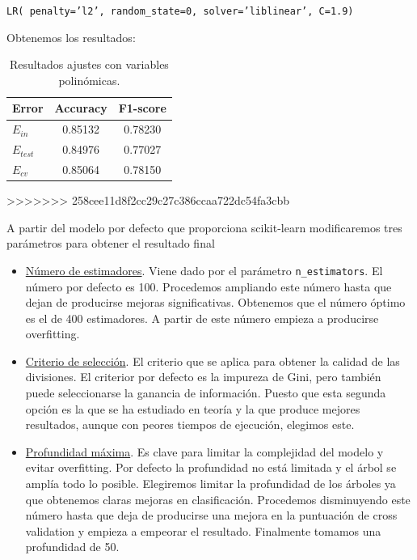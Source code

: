 \documentclass[11pt,a4paper]{article}
\begin{document}
{\begin{center}
    \texttt{LR( penalty='l2', random\_state=0, solver='liblinear', C=1.9)}
  \end{center}}

Obtenemos los resultados:

\begin{table}[h]
\begin{center}
\begin{tabular}{|l|c|c|}
\hline
  Error & Accuracy & F1-score \\ \hline
  $E_{in}$ & 0.85132 & 0.78230 \\
  $E_{test}$ & 0.84976 & 0.77027  \\
  $E_{cv}$ &0.85064 & 0.78150  \\\hline
\end{tabular}
\caption{Resultados ajustes con variables polinómicas.}

\end{center}
\end{table}
>>>>>>> 258cee11d8f2cc29c27c386ccaa722dc54fa3cbb

A partir del modelo por defecto que proporciona scikit-learn modificaremos tres parámetros para obtener el resultado final

\begin{itemize}
\item \underline{Número de estimadores}. Viene dado por el parámetro \texttt{n\_estimators}. El número por defecto es 100. Procedemos ampliando este número hasta que dejan de producirse mejoras significativas. Obtenemos que el número óptimo es el de 400 estimadores. A partir de este número empieza a producirse overfitting.
\item \underline{Criterio de selección}. El criterio que se aplica para obtener la calidad de las divisiones. El criterior por defecto es la impureza de Gini, pero también puede seleccionarse la ganancia de información. Puesto que esta segunda opción es la que se ha estudiado en teoría y la que produce mejores resultados, aunque con peores tiempos de ejecución, elegimos este. 
\item \underline{Profundidad máxima}. Es clave para limitar la complejidad del modelo y evitar overfitting. Por defecto la profundidad no está limitada y el árbol se amplía todo lo posible. Elegiremos limitar la profundidad de los árboles ya que obtenemos claras mejoras en clasificación. Procedemos disminuyendo este número hasta que deja de producirse una mejora en la puntuación de cross validation y empieza a empeorar el resultado. Finalmente tomamos una profundidad de 50.
\end{itemize}
\end{document}
